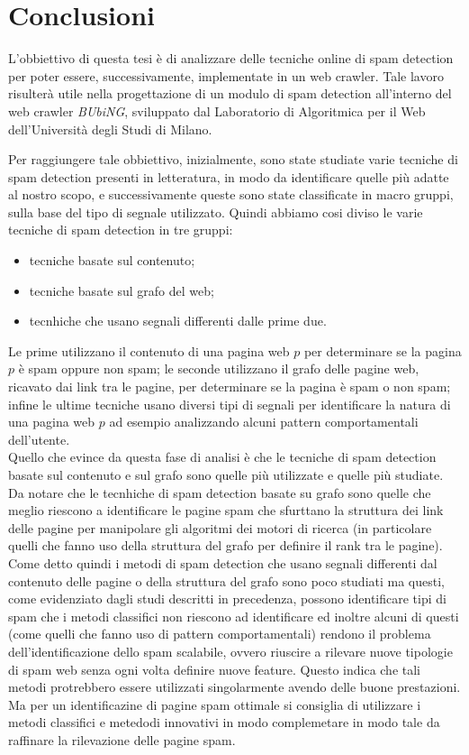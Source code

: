\chapter{Conclusioni}

L'obbiettivo di questa tesi è di analizzare delle tecniche online di spam detection per poter essere, successivamente, implementate in un web crawler. Tale lavoro risulterà utile nella progettazione di un modulo di spam detection all'interno del  web crawler \textit{BUbiNG}, sviluppato dal Laboratorio di Algoritmica per il Web dell'Università degli Studi di Milano.

Per raggiungere tale obbiettivo, inizialmente, sono state studiate varie tecniche di spam detection presenti in letteratura, in modo da identificare quelle più adatte al nostro scopo, e successivamente queste sono state classificate in macro gruppi, sulla base del tipo di segnale utilizzato. Quindi abbiamo cosi diviso le varie tecniche di spam detection in tre gruppi:
\begin{itemize}
 \item tecniche basate sul contenuto;
 \item tecniche basate sul grafo del web;
 \item tecnhiche che usano segnali differenti dalle prime due. 
\end{itemize}
Le prime utilizzano il contenuto di una pagina web \(p\) per determinare se la pagina \(p\) è spam oppure non spam; le seconde utilizzano il grafo delle pagine web, ricavato dai link tra le pagine, per determinare se la pagina è spam o non spam; infine le ultime tecniche usano diversi tipi di segnali per identificare la natura di una pagina web \(p\) ad esempio analizzando alcuni pattern comportamentali dell'utente.\\
Quello che evince da questa fase di analisi è che le tecniche di spam detection basate sul contenuto e sul grafo sono quelle più utilizzate e quelle più studiate. Da notare che le tecnhiche di spam detection basate su grafo sono quelle che meglio riescono a identificare le pagine spam che sfurttano la struttura dei link delle pagine per manipolare gli algoritmi dei motori di ricerca (in particolare quelli che fanno uso della struttura del grafo per definire il rank tra le pagine).\\
Come detto quindi i metodi di spam detection che usano segnali differenti dal contenuto delle pagine o della struttura del grafo sono poco studiati ma questi, come evidenziato dagli studi descritti in precedenza, possono identificare tipi di spam che i metodi classifici non riescono ad identificare ed inoltre alcuni di questi (come quelli che fanno uso di pattern comportamentali) rendono il problema dell’identificazione dello spam scalabile, ovvero riuscire a rilevare nuove tipologie di spam web senza ogni volta definire nuove feature. Questo indica che tali metodi protrebbero essere utilizzati singolarmente avendo delle buone prestazioni. Ma per un identificazine di pagine spam ottimale si consiglia di utilizzare i metodi classifici e metedodi innovativi  in modo complemetare in modo tale da raffinare la rilevazione delle pagine spam.

